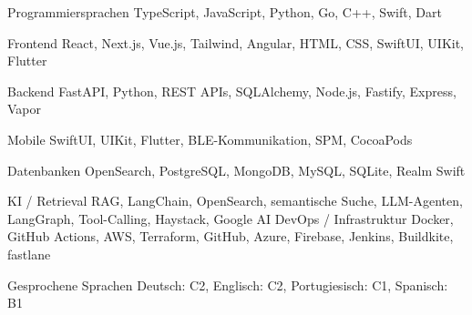 

\begin{cvskills}

\cvskill
{Programmiersprachen} %
{TypeScript, JavaScript, Python, Go, C++, Swift, Dart} %

\cvskill
{Frontend} %
{React, Next.js, Vue.js, Tailwind, Angular, HTML, CSS, SwiftUI, UIKit, Flutter} %

\cvskill
{Backend} %
{FastAPI, Python, REST APIs, SQLAlchemy, Node.js, Fastify, Express, Vapor} %

\cvskill
{Mobile} %
{SwiftUI, UIKit, Flutter, BLE-Kommunikation, SPM, CocoaPods} %

\cvskill
{Datenbanken} %
{OpenSearch, PostgreSQL, MongoDB, MySQL, SQLite, Realm Swift} %

\cvskill
{KI / Retrieval} %
{RAG, LangChain, OpenSearch, semantische Suche, LLM-Agenten, LangGraph, Tool-Calling, Haystack, Google AI} %
\cvskill
{DevOps / Infrastruktur} %
{Docker, GitHub Actions, AWS, Terraform, GitHub, Azure, Firebase, Jenkins, Buildkite, fastlane} %


\cvskill
{Gesprochene Sprachen} %
{Deutsch: C2, Englisch: C2, Portugiesisch: C1, Spanisch: B1} %


\end{cvskills}
